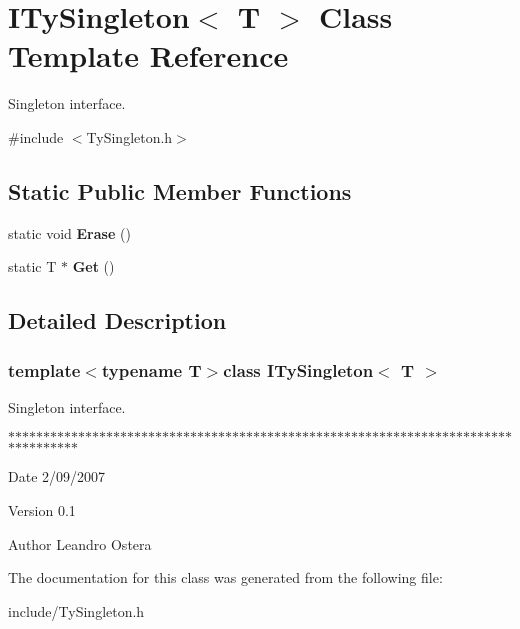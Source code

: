\hypertarget{class_i_ty_singleton}{
\section{ITySingleton$<$ T $>$ Class Template Reference}
\label{class_i_ty_singleton}
}


Singleton interface.  




{\ttfamily \#include $<$TySingleton.h$>$}

\subsection*{Static Public Member Functions}
\begin{DoxyCompactItemize}
\item 
\hypertarget{class_i_ty_singleton_a0ce782de119a27e5536b1e5864e82760}{
static void {\bfseries Erase} ()}
\label{class_i_ty_singleton_a0ce782de119a27e5536b1e5864e82760}

\item 
\hypertarget{class_i_ty_singleton_a5d52feebb9fe09f67611470e417c006b}{
static T $\ast$ {\bfseries Get} ()}
\label{class_i_ty_singleton_a5d52feebb9fe09f67611470e417c006b}

\end{DoxyCompactItemize}


\subsection{Detailed Description}
\subsubsection*{template$<$typename T$>$class ITySingleton$<$ T $>$}

Singleton interface. 

$\ast$$\ast$$\ast$$\ast$$\ast$$\ast$$\ast$$\ast$$\ast$$\ast$$\ast$$\ast$$\ast$$\ast$$\ast$$\ast$$\ast$$\ast$$\ast$$\ast$$\ast$$\ast$$\ast$$\ast$$\ast$$\ast$$\ast$$\ast$$\ast$$\ast$$\ast$$\ast$$\ast$$\ast$$\ast$$\ast$$\ast$$\ast$$\ast$$\ast$$\ast$$\ast$$\ast$$\ast$$\ast$$\ast$$\ast$$\ast$$\ast$$\ast$$\ast$$\ast$$\ast$$\ast$$\ast$$\ast$$\ast$$\ast$$\ast$$\ast$$\ast$$\ast$$\ast$$\ast$$\ast$$\ast$$\ast$$\ast$$\ast$$\ast$$\ast$$\ast$$\ast$$\ast$$\ast$$\ast$$\ast$$\ast$$\ast$$\ast$$\ast$$\ast$

\begin{DoxyDate}{Date}
2/09/2007 
\end{DoxyDate}
\begin{DoxyVersion}{Version}
0.1 
\end{DoxyVersion}
\begin{DoxyAuthor}{Author}
Leandro Ostera 
\end{DoxyAuthor}


The documentation for this class was generated from the following file:\begin{DoxyCompactItemize}
\item 
include/TySingleton.h\end{DoxyCompactItemize}
